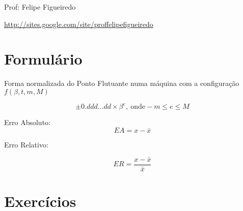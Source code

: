 \documentclass[a4paper]{article}
\begin{document}
\parbox[c]{.825\textwidth}{\raggedright%
{Prof: Felipe Figueiredo\par}
{\url{http://sites.google.com/site/proffelipefigueiredo}}

\vspace{1cm}
}


\section{Formulário}

Forma normalizada do Ponto Flutuante numa máquina com a configuração $f(\beta,t,m,M)$

\begin{displaymath}
  \pm 0.ddd \ldots dd \times \beta ^e  \mathrm {,\ onde } -m \le e \le M
\end{displaymath}


Erro Absoluto:
\begin{displaymath}
  EA = x - \bar{x}
\end{displaymath}

Erro Relativo:

\begin{displaymath}
  ER = \frac{x-\bar{x}}{\bar{x}}
\end{displaymath}
\section{Exercícios}
\end{document}
